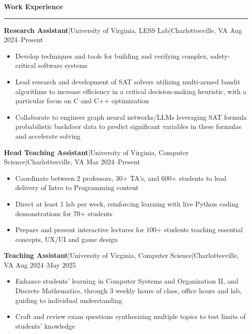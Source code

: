 \documentclass[11pt,letterpaper]{article}
\newcommand{\horibar}[2]{#1\hspace{5pt}|\hspace{5pt}#2}
\newcommand{\sep}[1]{\par\vspace{#1}}
\renewenvironment{section}[1]{
\sep{11pt}
{
\fontsize{14}{2}
\selectfont
\textbf{#1}\\[0.5pt]
}
\sep{4pt}
\noindent\rule{\linewidth}{0.5pt}
\sep{4pt}
}
{
}
\renewenvironment{subsection}[3]
{
\sep{4pt}
\horibar{\textbf{#1}}{#2} \hfill #3
\par\setstretch{1}
\begin{itemize}
}
{
\end{itemize}
\setstretch{0}
}
\begin{document}
\begin{section}{Work Experience}
    \begin{subsection}{Research Assistant}{\horibar{University of Virginia, LESS Lab}{Charlottesville, VA}}{Aug 2024–Present}
        \item Develop techniques and tools for building and verifying complex, safety-critical software systems 
        \item Lead research and development of SAT solvers utilizing multi-armed bandit algorithms to increase efficiency in a critical decision-making heuristic, with a particular focus on C and C++ optimization
        \item Collaborate to engineer graph neural networks/LLMs leveraging SAT formula probabilistic backdoor data to predict significant variables in these formulas and accelerate solving
    \end{subsection}
    \begin{subsection}{Head Teaching Assistant}{\horibar{University of Virginia, Computer Science}{Charlottesville, VA}}{Mar 2024–Present}
        \item Coordinate between 2 professors, 30+ TA's, and 600+ students to lead delivery of Intro to Programming content
        \item Direct at least 1 lab per week, reinforcing learning with live Python coding demonstrations for 70+ students
        \item Prepare and present interactive lectures for 100+ students teaching essential concepts, UX/UI and game design
    \end{subsection}
    \begin{subsection}{Teaching Assistant}{\horibar{University of Virginia, Computer Science}{Charlottesville, VA}}{Aug 2024–May 2025}
        \item Enhance students’ learning in Computer Systems and Organization II, and Discrete Mathematics, through 3 weekly hours of class, office hours and lab, guiding to individual understanding
        \item Craft and review exam questions synthesizing multiple topics to test limits of students’ knowledge
    \end{subsection}
\end{section}
\end{document}

